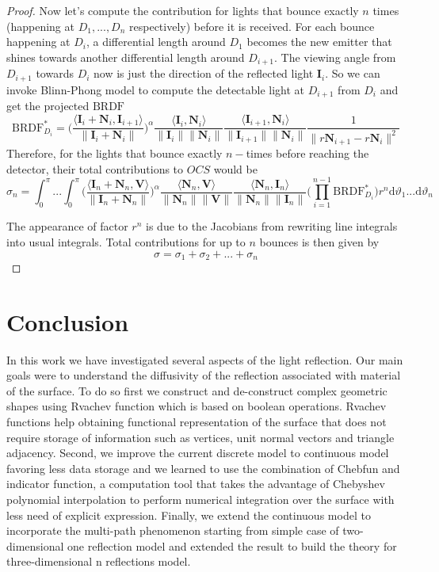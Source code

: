 \documentclass[11pt]{amsart}
\newcommand{\BRDF}{\mathrm{BRDF}}
\newcommand{\ip}[2]{\langle {#1}, {#2} \rangle}
\theoremstyle{definition}
\begin{document}
\begin{proof}
Now let's compute the contribution for lights that bounce exactly $n$ times (happening at $D_1,...,D_n$ respectively) before it is received. For each bounce happening at $D_i$, a differential length around $D_1$ becomes the new emitter that shines towards another differential length around $D_{i+1}$. The viewing angle from $D_{i+1}$ towards $D_i$ now is just the direction of the reflected light $\mathbf{I}_{i}$. So we can invoke Blinn-Phong model to compute the detectable light at $D_{i+1}$ from $D_i$ and get the projected $\BRDF$
$$\BRDF^*_{D_i}=\Bigg(\frac{\ip{\mathbf{I}_i+\mathbf{N}_i}{\mathbf{I}_{i+1}}}{\|\mathbf{I}_i+\mathbf{N}_i\|}\Bigg)^\alpha\frac{\ip{\mathbf{I}_i}{\mathbf{N}_i}}{\|\mathbf{I}_i\|\|\mathbf{N}_i\|}\frac{\ip{\mathbf{I}_{i+1}}{\mathbf{N}_i}}{\|\mathbf{I}_{i+1}\|\|\mathbf{N}_i\|} \frac{1}{\|r\mathbf{N}_{i+1}-r\mathbf{N}_i\|^2}$$
Therefore, for the lights that bounce exactly $n-$times before reaching the detector, their total contributions to $OCS$ would be 
\begin{equation*}
\sigma_n =\int_{0}^{\pi}...\int_{0}^{\pi}\Bigg(\frac{\ip{\mathbf{I}_n+\mathbf{N}_n}{\mathbf{V}}}{\|\mathbf{I}_n+\mathbf{N}_n\|}\Bigg)^\alpha\frac{\ip{\mathbf{N}_n}{\mathbf{V}}}{\|\mathbf{N}_n\| \|\mathbf{V}\|}\frac{\ip{\mathbf{N}_n}{\mathbf{I}_n}}{\|\mathbf{N}_n\| \|\mathbf{I}_n\|} \bigg(\prod_{i=1}^{n-1}\BRDF^*_{D_i}\bigg) r^n\mathrm{d}\vartheta_1...\mathrm{d}\vartheta_n
\end{equation*}

The appearance of factor $r^n$ is due to the Jacobians from rewriting line integrals into usual integrals. Total contributions for up to $n$ bounces is then given by
 $$ \sigma= \sigma_1+\sigma_2+...+\sigma_n$$
 \end{proof}
 
\section{Conclusion}

In this work we have investigated several aspects of the light reflection. Our main goals were to understand the diffusivity of the reflection associated with material of the surface. To do so first we construct and de-construct complex geometric shapes using Rvachev function which is based on boolean operations. Rvachev functions help obtaining functional representation of the surface that does not require storage of information such as vertices, unit normal vectors and triangle adjacency.
Second, we improve the current discrete model to continuous model favoring less data storage and we learned to use the combination of Chebfun and indicator function, a computation tool that takes the advantage of Chebyshev polynomial interpolation to perform numerical integration over the surface with less need of explicit expression.
Finally, we extend the continuous model to incorporate the multi-path phenomenon starting from simple case of two-dimensional one reflection model and extended the result to build the theory for three-dimensional n reflections model.
\end{document}
